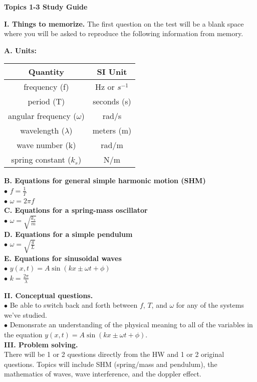 \documentclass[11pt]{article}
\begin{document}
{\centering
\textbf{Topics 1-3 Study Guide} \par
\vspace{\baselineskip}
}

\textbf{I. Things to memorize.}
The first question on the test will be a blank space where you will be asked to reproduce the following information from memory.
\vspace{0.5\baselineskip}

\begin{addmargin}[1em]{0em}%
\textbf{A. Units:}

\vspace{0.25\baselineskip}
\begin{tabular}{ |c|c| } 
\hline
Quantity & SI Unit \\ 
\hline
frequency (f) & Hz or $s^{-1}$ \\ 
\hline
period (T) & seconds (s) \\ 
\hline
angular frequency ($\omega$) & rad/s \\ 
\hline
wavelength ($\lambda$) & meters (m) \\ 
\hline
wave number (k) & rad/m \\ 
\hline
spring constant ($k_s$) & N/m \\ 
\hline
\end{tabular}
\vspace{0.75\baselineskip}

\textbf{B. Equations for general simple harmonic motion (SHM)} \\
$\bullet$ $f = \frac{1}{T}$ \\
$\bullet$ $\omega = 2\pi f$ \\

\textbf{C. Equations for a spring-mass oscillator} \\
$\bullet$ $\omega = \sqrt{\frac{k_s}{m}}$ \\

\textbf{D. Equations for a simple pendulum} \\
$\bullet$ $\omega = \sqrt{\frac{g}{L}}$ \\

\textbf{E. Equations for sinusoidal waves} \\
$\bullet$ $y(x,t) = A\sin(kx \pm \omega t + \phi)$ \\
$\bullet$ $k = \frac{2\pi}{\lambda}$ \\
\end{addmargin}

\vspace{\baselineskip}
\textbf{II. Conceptual questions.} \\
$\bullet$ Be able to switch back and forth between $f$, $T$, and $\omega$ for any of the systems we've studied. \\
$\bullet$ Demonsrate an understanding of the physical meaning to all of the variables in the equation $y(x,t) = A\sin(kx \pm \omega t + \phi)$. \\

\vspace{\baselineskip}
\textbf{III. Problem solving.} \\
There will be 1 or 2 questions directly from the HW and 1 or 2 original questions.
Topics will include SHM (spring/mass and pendulum), the mathematics of waves, wave interference, and the doppler effect.
\end{document}
